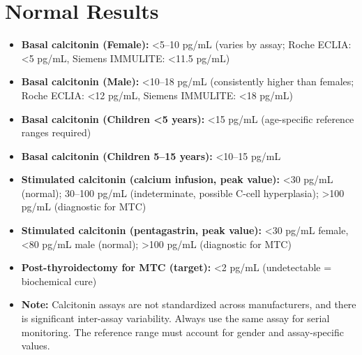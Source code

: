\section*{Normal Results}
\begin{itemize}
  \item \textbf{Basal calcitonin (Female):} <5--10 pg/mL (varies by assay; Roche ECLIA: <5 pg/mL, Siemens IMMULITE: <11.5 pg/mL)
  \item \textbf{Basal calcitonin (Male):} <10--18 pg/mL (consistently higher than females; Roche ECLIA: <12 pg/mL, Siemens IMMULITE: <18 pg/mL)
  \item \textbf{Basal calcitonin (Children <5 years):} <15 pg/mL (age-specific reference ranges required)
  \item \textbf{Basal calcitonin (Children 5--15 years):} <10--15 pg/mL
  \item \textbf{Stimulated calcitonin (calcium infusion, peak value):} <30 pg/mL (normal); 30--100 pg/mL (indeterminate, possible C-cell hyperplasia); >100 pg/mL (diagnostic for MTC)
  \item \textbf{Stimulated calcitonin (pentagastrin, peak value):} <30 pg/mL female, <80 pg/mL male (normal); >100 pg/mL (diagnostic for MTC)
  \item \textbf{Post-thyroidectomy for MTC (target):} <2 pg/mL (undetectable = biochemical cure)
  \item \textbf{Note:} Calcitonin assays are not standardized across manufacturers, and there is significant inter-assay variability. Always use the same assay for serial monitoring. The reference range must account for gender and assay-specific values.
\end{itemize}

